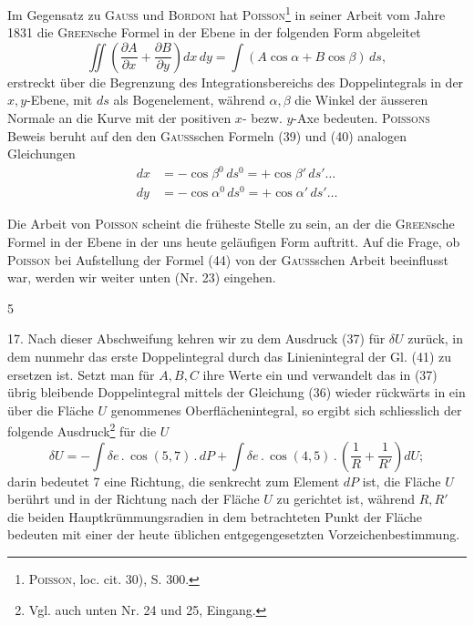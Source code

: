Im Gegensatz zu \textsc{Gauss} und \textsc{Bordoni} hat \textsc{Poisson}\footnote{\textsc{Poisson}, loc. cit. 30), S. 300.} in seiner Arbeit vom
Jahre 1831 die \textsc{Green}sche Formel in der Ebene in der folgenden Form abgeleitet
\begin{equation*}
\iint\left(\frac{\partial A}{\partial x}+\frac{\partial B}{\partial y}\right)dx\,dy
=\int(A\cos\alpha+B\cos\beta)\,ds,\tag{44}
\end{equation*}
erstreckt über die Begrenzung des Integrationsbereichs des Doppelintegrals in
der $x,y$-Ebene, mit $ds$ als Bogenelement, während $\alpha,\beta$ die Winkel der
äusseren Normale an die Kurve mit der positiven $x$- bezw. $y$-Axe bedeuten.
\textsc{Poissons} Beweis beruht auf den den \textsc{Gauss}schen Formeln (39) und (40) analogen
Gleichungen
\[
\begin{aligned}
dx&=-\cos\beta^0\,ds^0=+\cos\beta'\,ds'\ldots\\
dy&=-\cos\alpha^0\,ds^0=+\cos\alpha'\,ds'\ldots
\end{aligned}
\]

Die Arbeit von \textsc{Poisson} scheint die früheste Stelle zu sein, an der die
\textsc{Green}sche Formel in der Ebene in der uns heute geläufigen Form auftritt.
Auf die Frage, ob \textsc{Poisson} bei Aufstellung der Formel (44) von der \textsc{Gauss}schen
Arbeit beeinflusst war, werden wir weiter unten (Nr. 23) eingehen.
\par\smallskip{}\hfill{\small 5}\par
\clearpage{}
\noindent\hspace*{\parindent}17. Nach dieser Abschweifung kehren wir zu dem Ausdruck (37) für
$\delta U$ zurück, in dem nunmehr das erste Doppelintegral durch das Linienintegral
der Gl. (41) zu ersetzen ist. Setzt man für $A,B,C$ ihre Werte ein und verwandelt
das in (37) übrig bleibende Doppelintegral mittels der Gleichung (36)
wieder rückwärts in ein über die Fläche $U$ genommenes Oberflächenintegral,
so ergibt sich schliesslich der folgende Ausdruck\footnote{Vgl. auch unten Nr. 24 und 25, Eingang.} für die  $U$
\begin{equation*}
\delta U=-\int\delta e\mathbin{.}\cos(5,7)\mathbin{.}dP
+\int\delta e\mathbin{.}\cos(4,5)\mathbin{.}\left(\frac{1}{R}+\frac{1}{R'}\right)dU;\tag{45}
\end{equation*}
darin bedeutet 7 eine Richtung, die senkrecht zum Element $dP$ ist, die Fläche
$U$ berührt und in der Richtung nach der Fläche $U$ zu gerichtet ist, während
$R,R'$ die beiden Hauptkrümmungsradien in dem betrachteten Punkt der Fläche
bedeuten mit einer der heute üblichen entgegengesetzten Vorzeichenbestimmung.

